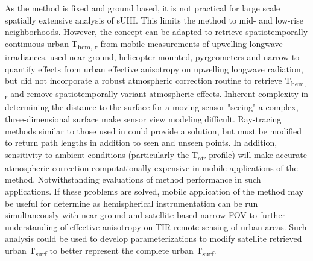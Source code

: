 \begin{bibunit}
As the method is fixed and ground based, it is not practical for large scale spatially extensive analysis of sUHI. This limits the method to mid- and low-rise neighborhoods. However, the concept can be adapted to retrieve spatiotemporally continuous urban T\textsubscript{hem, r} from mobile measurements of upwelling longwave irradiances. \citet{Sugawara2006} used near-ground, helicopter-mounted, pyrgeometers and narrow to quantify effects from urban effective anisotropy on upwelling longwave radiation, but did not incorporate a robust atmospheric correction routine to retrieve T\textsubscript{hem, r} and remove spatiotemporally variant atmospheric effects. Inherent complexity in determining the distance to the surface for a moving sensor "seeing" a complex, three-dimensional surface make sensor view modeling difficult. Ray-tracing methods similar to those used in \citet{Ceamanos2017} could provide a solution, but must be modified to return path lengths in addition to seen and unseen points. In addition, sensitivity to ambient conditions (particularly the T\textsubscript{air} profile) will make accurate atmospheric correction computationally expensive in mobile applications of the method. Notwithstanding evaluations of method performance in such applications. If these problems are solved, mobile application of the method may be useful for determine as hemispherical instrumentation can be run simultaneously with near-ground and satellite based narrow-FOV to further understanding of effective anisotropy on TIR remote sensing of urban areas. Such analysis could be used to develop parameterizations to modify satellite retrieved urban T\textsubscript{surf} to better represent the complete urban T\textsubscript{surf}.


\end{bibunit}
